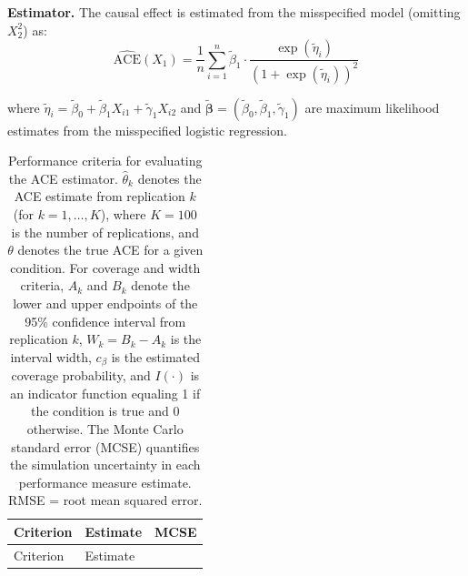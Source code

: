 \documentclass[
  man,
  longtable,
  nolmodern,
  notxfonts,
  notimes,
  colorlinks=true,linkcolor=blue,citecolor=blue,urlcolor=blue]{apa7}
\begin{document}
\textbf{Estimator.} The causal effect is estimated from the misspecified
model (omitting \(X_2^2\)) as: \[
\widehat{\text{ACE}}(X_1) = \frac{1}{n}\sum_{i=1}^{n} \tilde{\beta}_1 \cdot \frac{\exp(\tilde{\eta}_i)}{(1 + \exp(\tilde{\eta}_i))^2}
\]

\noindent where
\(\tilde{\eta}_i = \tilde{\beta}_0 + \tilde{\beta}_1 X_{i1} + \tilde{\gamma}_1 X_{i2}\)
and
\(\tilde{\boldsymbol{\beta}} = (\tilde{\beta}_0, \tilde{\beta}_1, \tilde{\gamma}_1)\)
are maximum likelihood estimates from the misspecified logistic
regression.

\begin{longtable}[]{@{}
  >{\raggedright\arraybackslash}p{}
  >{\raggedright\arraybackslash}p{}
  >{\raggedright\arraybackslash}p{}@{}}
\caption{Performance criteria for evaluating the ACE estimator.
\(\hat{\theta}_k\) denotes the ACE estimate from replication \(k\) (for
\(k = 1, \ldots, K\)), where \(K = 100\) is the number of replications,
and \(\theta\) denotes the true ACE for a given condition. For coverage
and width criteria, \(A_k\) and \(B_k\) denote the lower and upper
endpoints of the 95\% confidence interval from replication \(k\),
\(W_k = B_k - A_k\) is the interval width, \(c_{\beta}\) is the
estimated coverage probability, and \(I(\cdot)\) is an indicator
function equaling 1 if the condition is true and 0 otherwise. The Monte
Carlo standard error (MCSE) quantifies the simulation uncertainty in
each performance measure estimate. RMSE = root mean squared
error.}\tabularnewline
\toprule\noalign{}
\begin{minipage}[b]{\linewidth}\raggedright
Criterion
\end{minipage} & \begin{minipage}[b]{\linewidth}\raggedright
Estimate
\end{minipage} & \begin{minipage}[b]{\linewidth}\raggedright
MCSE
\end{minipage} \\
\midrule\noalign{}
\endfirsthead
\toprule\noalign{}
\begin{minipage}[b]{\linewidth}\raggedright
Criterion
\end{minipage} & \begin{minipage}[b]{\linewidth}\raggedright
Estimate
\end{minipage} & \begin{minipage}[b]{\linewidth}\raggedright

\end{minipage}
\end{longtable}
\end{document}
